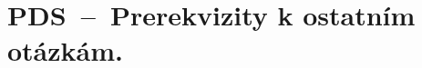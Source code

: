 

\graphicspath{{pds/pds_prerekvizity/figures}}


\chapter{PDS~--~Prerekvizity k ostatním otázkám.}





